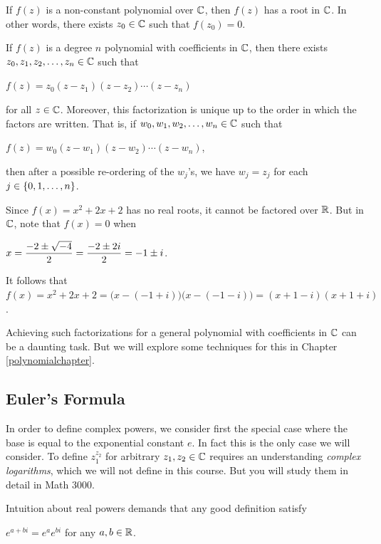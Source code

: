 \documentclass[11pt,fleqn,dvipsnames,usenames]{article}
\newcommand{\p}{\noindent}
\begin{document}
\begin{theorem}\label{ftoalgebra}
If $f(z)$ is a non-constant polynomial over $\mathbb{C}$, then $f(z)$ has a root in $\mathbb{C}$.  In other words, there exists $z_{0}\in\mathbb{C}$ such that $f(z_{0}) = 0$.
\end{theorem}
%
\begin{corollary}\label{ftoalgebracorollary}
If $f(z)$ is a degree $n$ polynomial with coefficients in $\mathbb{C}$, then there exists $z_{0},z_{1},z_{2},\ldots,z_{n}\in\nolinebreak\C$ such that
\begin{center}
$f(z) = z_{0}(z - z_{1})(z - z_{2})\cdots (z - z_{n})$
\end{center}
for all $z\in \mathbb{C}$.  Moreover, this factorization is unique up to the order in which the factors are written.  That is, if $w_{0},w_{1},w_{2},\ldots, w_{n}\in\mathbb{C}$ such that
\begin{center}
$f(z) = w_{0}(z - w_{1})(z - w_{2})\cdots (z - w_{n})$,
\end{center}
then after a possible re-ordering of the $w_{j}$'s, we have $w_{j} = z_{j}$ for each $j\in\left\{0,1,\ldots, n\right\}$.
\end{corollary}
%
\begin{example}
Since $f(x) = x^2 + 2x + 2$ has no real roots, it cannot be factored over $\mathbb{R}$.  But in $\mathbb{C}$, note that $f(x) = 0$ when
\begin{center}
$\displaystyle{x = \frac{-2 \pm \sqrt{-4}}{2} = \frac{-2 \pm 2i}{2} = -1\pm i}$.
\end{center}
It follows that $f(x) = x^2 + 2x + 2 = \big(x - (-1 + i)\big)\big(x - (-1 - i)\big) = (x + 1 - i)(x +1 +i)$.
\end{example}
%
\p Achieving such factorizations for a general polynomial with coefficients in $\mathbb{C}$ can be a daunting task.  But we will explore some techniques for this in Chapter \ref{polynomialchapter}.

\subsection{Euler's Formula}

\begin{remark}\label{complexpowerexpectation}
In order to define complex powers, we consider first the special case where the base is equal to the exponential constant $e$.  In fact this is the only case we will consider.  To define $z_{1}^{z_{2}}$ for arbitrary $z_{1},z_{2}\in\mathbb{C}$ requires an understanding \emph{complex logarithms}, which we will not define in this course.  But you will study them in detail in Math 3000.
\vsp

\p Intuition about real powers demands that any good definition satisfy
\begin{center}
$e^{a+bi} = e^{a}e^{bi}$ for any $a,b\in\mathbb{R}$.
\end{center}
\end{remark}
\end{document}
